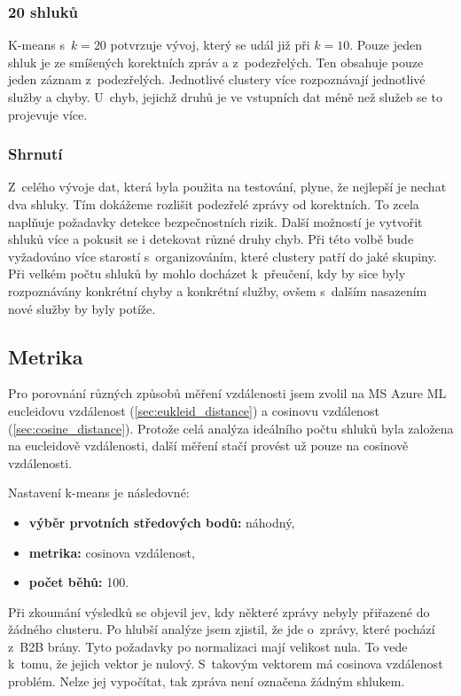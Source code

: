 \documentclass[thesis=M,czech]{FITthesis}[2012/10/20]
\begin{document}
				\subsubsection{20 shluků}
				K-means s~$k = 20$ potvrzuje vývoj, který se udál již při $k = 10$. Pouze jeden shluk je ze smíšených korektních zpráv a z~podezřelých. Ten obsahuje pouze jeden záznam z~podezřelých. Jednotlivé clustery více rozpoznávají jednotlivé služby a chyby. U~chyb, jejichž druhů je ve vstupních dat méně než služeb se to projevuje více.
				
				\subsubsection{Shrnutí}
					Z~celého vývoje dat, která byla použita na testování, plyne, že nejlepší je nechat dva shluky. Tím dokážeme rozlišit podezřelé zprávy od korektních. To zcela naplňuje požadavky detekce bezpečnostních rizik. Další možností je vytvořit shluků více a pokusit se i detekovat různé druhy chyb. Při této volbě bude vyžadováno více starostí s~organizováním, které clustery patří do jaké skupiny. Při velkém počtu shluků by mohlo docházet k~přeučení, kdy by sice byly rozpoznávány konkrétní chyby a konkrétní služby, ovšem s~dalším nasazením nové služby by byly potíže.
		
		\subsection{Metrika}
			Pro porovnání různých způsobů měření vzdálenosti jsem zvolil na MS Azure ML eucleidovu vzdálenost (\ref{sec:eukleid_distance}) a cosinovu vzdálenost (\ref{sec:cosine_distance}). Protože celá analýza ideálního počtu shluků byla založena na eucleidově vzdálenosti, další měření stačí provést už pouze na cosinově vzdálenosti.
			
			Nastavení k-means je následovné:
			\begin{itemize} 
				\item \textbf{výběr prvotních středových bodů: } náhodný,
				\item \textbf{metrika: } cosinova vzdálenost,
				\item \textbf{počet běhů: } 100.		
			\end{itemize}
		
			Při zkoumání výsledků se objevil jev, kdy některé zprávy nebyly přiřazené do žádného clusteru. Po hlubší analýze jsem zjistil, že jde o~zprávy, které pochází z~B2B brány. Tyto požadavky po normalizaci mají velikost nula. To vede k~tomu, že jejich vektor je nulový. S~takovým vektorem má cosinova vzdálenost problém. Nelze jej vypočítat, tak zpráva není označena žádným shlukem.
			
\end{document}
